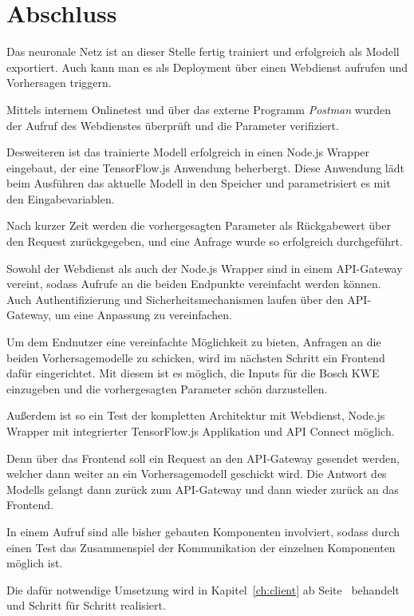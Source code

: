 \section{Abschluss}
Das neuronale Netz ist an dieser Stelle fertig trainiert und erfolgreich als Modell exportiert. Auch kann man es als
Deployment über einen Webdienst aufrufen und Vorhersagen triggern.

Mittels internem Onlinetest und über das externe Programm \textit{Postman} wurden der Aufruf des Webdienstes überprüft
und die Parameter verifiziert.

Desweiteren ist das trainierte Modell erfolgreich in einen Node.js Wrapper eingebaut, der eine TensorFlow.js
Anwendung beherbergt. Diese Anwendung lädt beim Ausführen das aktuelle Modell in den Speicher und parametrisiert es
mit den Eingabevariablen.

Nach kurzer Zeit werden die vorhergesagten Parameter als Rückgabewert über den Request zurückgegeben, und eine Anfrage
wurde so erfolgreich durchgeführt.

Sowohl der Webdienst als auch der Node.js Wrapper sind in einem API-Gateway vereint, sodass Aufrufe an die beiden
Endpunkte vereinfacht werden können. Auch Authentifizierung und Sicherheitsmechanismen laufen über den API-Gateway, um
eine Anpassung zu vereinfachen.

Um dem Endnutzer eine vereinfachte Möglichkeit zu bieten, Anfragen an die beiden Vorhersagemodelle zu schicken, wird
im nächsten Schritt ein Frontend dafür eingerichtet. Mit diesem ist es möglich, die Inputs für die Bosch KWE einzugeben
und die vorhergesagten Parameter schön darzustellen.

Außerdem ist so ein Test der kompletten Architektur mit Webdienst, Node.js Wrapper mit integrierter TensorFlow.js
Applikation und API Connect möglich.

Denn über das Frontend soll ein Request an den API-Gateway gesendet werden, welcher dann weiter an ein Vorhersagemodell
geschickt wird. Die Antwort des Modells gelangt dann zurück zum API-Gateway und dann wieder zurück an das Frontend.

In einem Aufruf sind alle bisher gebauten Komponenten involviert, sodass durch einen Test das Zusammenspiel der
Kommunikation der einzelnen Komponenten möglich ist.

Die dafür notwendige Umsetzung wird in Kapitel~\ref{ch:client} ab Seite~\pageref{ch:client} behandelt und Schritt für
Schritt realisiert.

